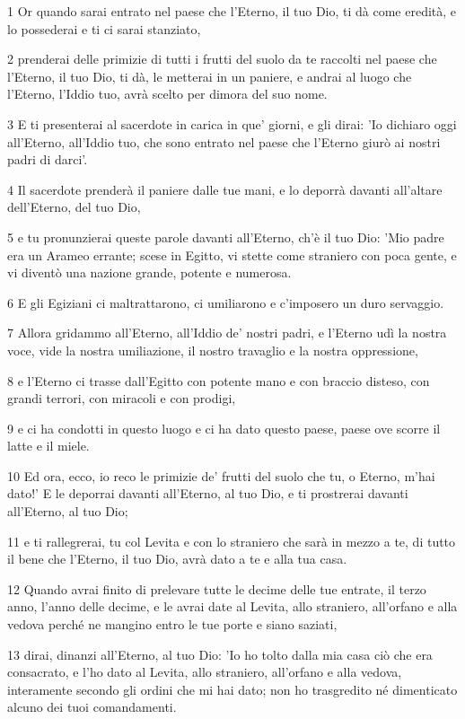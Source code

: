 \par 1 Or quando sarai entrato nel paese che l'Eterno, il tuo Dio, ti dà come eredità, e lo possederai e ti ci sarai stanziato,
\par 2 prenderai delle primizie di tutti i frutti del suolo da te raccolti nel paese che l'Eterno, il tuo Dio, ti dà, le metterai in un paniere, e andrai al luogo che l'Eterno, l'Iddio tuo, avrà scelto per dimora del suo nome.
\par 3 E ti presenterai al sacerdote in carica in que' giorni, e gli dirai: 'Io dichiaro oggi all'Eterno, all'Iddio tuo, che sono entrato nel paese che l'Eterno giurò ai nostri padri di darci'.
\par 4 Il sacerdote prenderà il paniere dalle tue mani, e lo deporrà davanti all'altare dell'Eterno, del tuo Dio,
\par 5 e tu pronunzierai queste parole davanti all'Eterno, ch'è il tuo Dio: 'Mio padre era un Arameo errante; scese in Egitto, vi stette come straniero con poca gente, e vi diventò una nazione grande, potente e numerosa.
\par 6 E gli Egiziani ci maltrattarono, ci umiliarono e c'imposero un duro servaggio.
\par 7 Allora gridammo all'Eterno, all'Iddio de' nostri padri, e l'Eterno udì la nostra voce, vide la nostra umiliazione, il nostro travaglio e la nostra oppressione,
\par 8 e l'Eterno ci trasse dall'Egitto con potente mano e con braccio disteso, con grandi terrori, con miracoli e con prodigi,
\par 9 e ci ha condotti in questo luogo e ci ha dato questo paese, paese ove scorre il latte e il miele.
\par 10 Ed ora, ecco, io reco le primizie de' frutti del suolo che tu, o Eterno, m'hai dato!' E le deporrai davanti all'Eterno, al tuo Dio, e ti prostrerai davanti all'Eterno, al tuo Dio;
\par 11 e ti rallegrerai, tu col Levita e con lo straniero che sarà in mezzo a te, di tutto il bene che l'Eterno, il tuo Dio, avrà dato a te e alla tua casa.
\par 12 Quando avrai finito di prelevare tutte le decime delle tue entrate, il terzo anno, l'anno delle decime, e le avrai date al Levita, allo straniero, all'orfano e alla vedova perché ne mangino entro le tue porte e siano saziati,
\par 13 dirai, dinanzi all'Eterno, al tuo Dio: 'Io ho tolto dalla mia casa ciò che era consacrato, e l'ho dato al Levita, allo straniero, all'orfano e alla vedova, interamente secondo gli ordini che mi hai dato; non ho trasgredito né dimenticato alcuno dei tuoi comandamenti.
